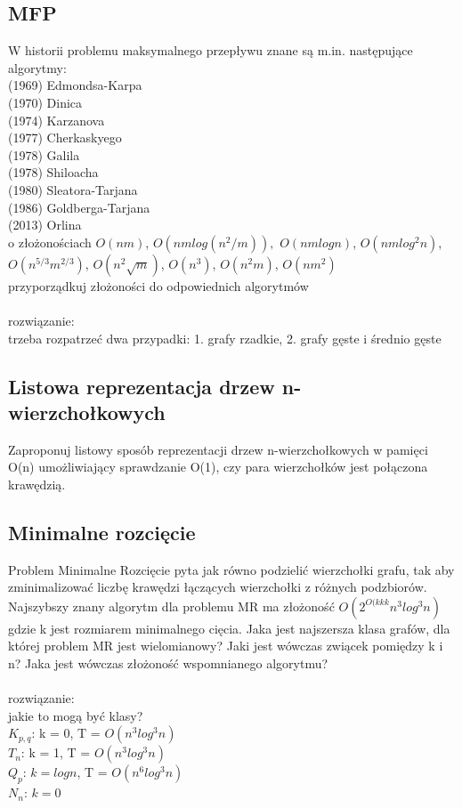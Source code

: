 \documentclass{article}
\begin{document}
\subsection*{MFP}
W historii problemu maksymalnego przepływu znane są m.in.  następujące algorytmy:\\
(1969) Edmondsa-Karpa \\
(1970) Dinica \\
(1974) Karzanova \\
(1977) Cherkaskyego \\
(1978) Galila \\
(1978) Shiloacha \\
(1980) Sleatora-Tarjana \\
(1986) Goldberga-Tarjana \\
(2013) Orlina \\
o złożonościach $O(nm)$, $O(nmlog(n^2/m)),$ $O(nmlogn)$, $O(nmlog^2n)$, $O(n^{5/3}m^{2/3})$, $O(n^2\sqrt m)$, $O(n^3)$, $O(n^2m)$, $O(nm^2)$ \\
przyporządkuj złożoności do odpowiednich algorytmów \\\\ rozwiązanie: \\
trzeba rozpatrzeć dwa przypadki: 1. grafy rzadkie, 2. grafy gęste i średnio gęste

\subsection*{Listowa reprezentacja drzew n-wierzchołkowych}
Zaproponuj listowy sposób reprezentacji drzew n-wierzchołkowych w pamięci O(n) umożliwiający sprawdzanie O(1), 
czy para wierzchołków jest połączona krawędzią. 

\subsection*{Minimalne rozcięcie}
Problem Minimalne Rozcięcie pyta jak równo podzielić wierzchołki grafu, tak aby zminimalizować liczbę krawędzi łączących wierzchołki z różnych podzbiorów.
Najszybszy znany algorytm dla problemu MR ma złożoność $O(2^{O(kkk}n^3log^3n)$ gdzie k jest rozmiarem minimalnego cięcia. Jaka jest najszersza klasa grafów, 
dla której problem MR jest wielomianowy? Jaki jest wówczas zwiącek pomiędzy k i n? Jaka jest wówczas złożoność wspomnianego algorytmu? \\\\rozwiązanie:\\
jakie to mogą być klasy? \\
$K_{p,q}$: k = 0, T = $O(n^3log^3n)$ \\
$T_n$: k = 1,  T = $O(n^3log^3n)$ \\
$Q_p$: $k = logn$, T = $O(n^6log^3n)$ \\
$N_n$: $k = 0$
\end{document}
